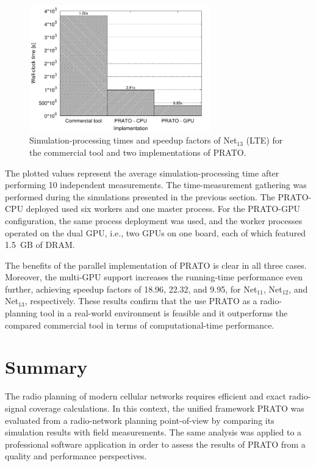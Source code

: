 \begin{figure}[h]
\centering

\includegraphics[width=0.7\textwidth]{08-real_network_planning/img/lte_running_times}

\caption{Simulation-processing times and speedup factors of Net$_{13}$ (LTE)
for the commercial tool and two implementations of PRATO. \label{fig:08-Running_times-LTE}}
\end{figure}


The plotted values represent the average simulation-processing time
after performing 10 independent measurements. The time-measurement
gathering was performed during the simulations presented in the previous
section. The PRATO-CPU deployed used six workers and one master process.
For the PRATO-GPU configuration, the same process deployment was used,
and the worker processes operated on the dual GPU, i.e., two GPUs
on one board, each of which featured 1.5~GB of DRAM. 

The benefits of the parallel implementation of PRATO is clear in all
three cases. Moreover, the multi-GPU support increases the running-time
performance even further, achieving speedup factors of 18.96, 22.32,
and 9.95, for Net$_{11}$, Net$_{12}$, and Net$_{13}$, respectively.
These results confirm that the use PRATO as a radio-planning tool
in a real-world environment is feasible and it outperforms the compared
commercial tool in terms of computational-time performance.


\section{Summary}

The radio planning of modern cellular networks requires efficient
and exact radio-signal coverage calculations. In this context, the
unified framework PRATO was evaluated from a radio-network planning
point-of-view by comparing its simulation results with field measurements.
The same analysis was applied to a professional software application
in order to assess the results of PRATO from a quality and performance
perspectives.

